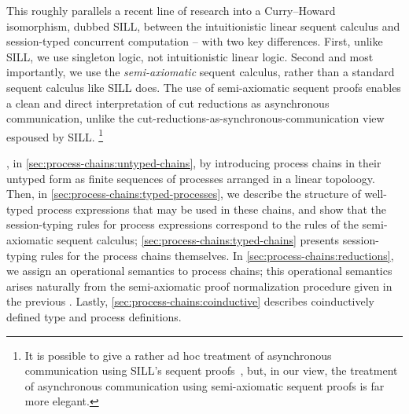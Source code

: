 This roughly parallels a recent line of research into a Curry--Howard isomorphism, dubbed SILL, between the intuitionistic linear sequent calculus and session-typed concurrent computation\autocites{Caires+:MSCS16}{Caires+:TLDI12} -- with two key differences.
First, unlike SILL, we use singleton logic, not intuitionistic linear logic.
Second and most importantly, we use the \emph{semi-axiomatic} sequent calculus, rather than a standard sequent calculus like SILL does.
The use of semi-axiomatic sequent proofs enables a clean and direct interpretation of cut reductions as asynchronous communication, unlike the cut-reductions-as-synchronous-communication view espoused by SILL.%
\footnote{It is possible to give a rather ad hoc treatment of asynchronous communication using SILL's sequent proofs~\parencite{DeYoung+:CSL12}, but, in our view, the treatment of asynchronous communication using semi-axiomatic sequent proofs is far more elegant.}







, in \cref{sec:process-chains:untyped-chains}, by introducing process chains in their untyped form as finite sequences of processes arranged in a linear topoloogy.
Then, in \cref{sec:process-chains:typed-processes}, we describe the structure of well-typed process expressions that may be used in these chains, and show that the session-typing rules for process expressions correspond to the rules of the semi-axiomatic sequent calculus;
\cref{sec:process-chains:typed-chains} presents session-typing rules for the process chains themselves.
In \cref{sec:process-chains:reductions}, we assign an operational semantics to process chains; this operational semantics arises naturally from the semi-axiomatic proof normalization procedure given in the previous .
Lastly, \cref{sec:process-chains:coinductive} describes coinductively defined type and process definitions.


